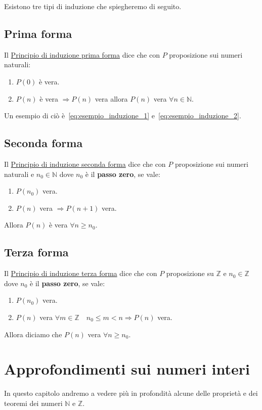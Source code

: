 \documentclass{article}
\theoremstyle{definition}
\begin{document}
Esistono tre tipi di induzione che spiegheremo di seguito.



\subsection{Prima forma}\label{sec:induzione_prima_forma}
Il \underline{Principio di induzione prima forma} dice che con $P$ proposizione sui numeri naturali:
\begin{enumerate}
        \item $P(0)$ è vera. 
        \item $P(n)$ è vera $\Rightarrow P(n)$ vera allora $P(n)$ vera $\forall n \in \mathbb{N}$. 
\end{enumerate}
Un esempio di ciò è~\ref{eq:esempio_induzione_1} e~\ref{eq:esempio_induzione_2}.



\subsection{Seconda forma}\label{sec:induzione_seconda_forma}
Il \underline{Principio di induzione seconda forma} dice che con $P$ proposizione sui numeri naturali e $n_0 \in \mathbb{N}$ dove $n_0$ è il \textbf{passo zero}, se vale:
\begin{enumerate}
        \item $P(n_0)$ vera.
        \item $P(n)$ vera $\Rightarrow P(n+1)$ vera.
\end{enumerate}
Allora $P(n)$ è vera $\forall n \ge n_0$.


\subsection{Terza forma}\label{sec:induzione_terza_forma}
Il \underline{Principio di induzione terza forma} dice che con $P$ proposizione su $\mathbb{Z}$ e $n_0 \in \mathbb{Z}$ dove $n_0$ è il \textbf{passo zero}, se vale:
\begin{enumerate}
        \item $P(n_0)$ vera. 
        \item $P(n)$ vera $\forall m \in \mathbb{Z} \quad n_0 \le m < n \Rightarrow P(n)$ vera. 
\end{enumerate}
Allora diciamo che $P(n)$ vera $\forall n \ge n_0$.






\newpage
\section{Approfondimenti sui numeri interi}\label{sec:numeri_interi}
In questo capitolo andremo a vedere più in profondità alcune delle proprietà e dei teoremi dei numeri $ \mathbb{N} $ e $ \mathbb{Z} $.   
\end{document}
